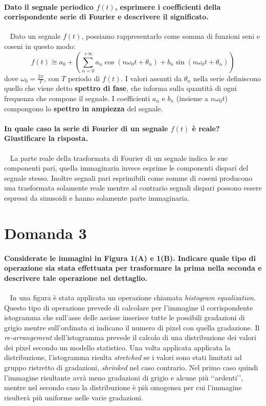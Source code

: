 \documentclass[a4paper,oneside]{scrbook}
\begin{document}
\paragraph{Dato il segnale periodico $f(t)$, esprimere i coefficienti della corrispondente serie di Fourier e descrivere il significato.}\
\newline
Dato un segnale $f(t)$, possiamo rappresentarlo come somma di funzioni seni e coseni in questo modo:
\begin{equation*}
	f(t) \cong a_0 + \left( \sum_{n=0}^{+\infty} a_n \cos(n\omega_0t+\theta_n)+b_n\sin(n\omega_0t+\theta_n) \right)
\end{equation*}
dove $\omega_0=\frac{2\pi}{T}$, con $T$ periodo di $f(t)$. I valori assunti da $\theta_n$ nella serie definiscono quello che viene detto \textbf{spettro di fase},
che informa sulla quantità di ogni frequenza che compone il segnale.
I coefficienti $a_n$ e $b_n$ (insieme a $n\omega_0t$) compongono lo \textbf{spettro in ampiezza} del segnale.

\paragraph{In quale caso la serie di Fourier di un segnale $f(t)$ è reale? Giustificare la risposta.}\
\newline
La parte reale della trasformata di Fourier di un segnale indica le sue componenti pari, quella immaginaria invece esprime le componenti dispari del segnale stesso.
Inoltre segnali pari esprimibili come somme di coseni producono una trasformata solamente reale mentre al contrario segnali dispari possono essere espressi da sinusoidi
e hanno solamente parte immaginaria.

\section*{Domanda 3}
\paragraph{Considerate le immagini in Figura 1(A) e 1(B). Indicare quale tipo di operazione sia stata effettuata per trasformare la prima nella seconda e descrivere tale
operazione nel dettaglio.}\
\newline
In una figura è stata applicata un operazione chiamata \textit{histogram equalization}. Questo tipo di operazione prevede di calcolare per l'immagine il corrispondente
istogramma che sull'asse delle ascisse inserisce tutte le possibili gradazioni di grigio mentre sull'ordinata si indicano il numero di pixel con quella gradazione.
Il \textit{re-arrangement} dell'istogramma prevede il calcolo di una distribuzione dei valori dei pixel secondo un modello statistico. Una volta applicata applicata la
distribuzione, l'istogramma risulta \textit{stretched} se i valori sono stati limitati ad gruppo ristretto di gradazioni, \textit{shrinked} nel caso contrario.
Nel primo caso quindi l'immagine risultante avrà meno gradazioni di grigio e alcune più ‘‘ardenti’’, mentre nel secondo caso la distribuzione è più omogenea per cui
l'immagine risulterà più uniforme nelle varie gradazioni.
\end{document}
